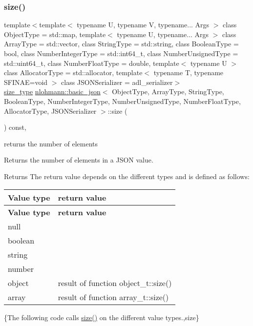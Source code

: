 \subsubsection{\texorpdfstring{size()}{size()}}
{\footnotesize\ttfamily template$<$template$<$ typename U, typename V, typename... Args $>$ class Object\+Type = std\+::map, template$<$ typename U, typename... Args $>$ class Array\+Type = std\+::vector, class String\+Type  = std\+::string, class Boolean\+Type  = bool, class Number\+Integer\+Type  = std\+::int64\+\_\+t, class Number\+Unsigned\+Type  = std\+::uint64\+\_\+t, class Number\+Float\+Type  = double, template$<$ typename U $>$ class Allocator\+Type = std\+::allocator, template$<$ typename T, typename S\+F\+I\+N\+A\+E=void $>$ class J\+S\+O\+N\+Serializer = adl\+\_\+serializer$>$ \\
\mbox{\hyperlink{classnlohmann_1_1basic__json_a39f2cd0b58106097e0e67bf185cc519b}{size\+\_\+type}} \mbox{\hyperlink{classnlohmann_1_1basic__json}{nlohmann\+::basic\+\_\+json}}$<$ Object\+Type, Array\+Type, String\+Type, Boolean\+Type, Number\+Integer\+Type, Number\+Unsigned\+Type, Number\+Float\+Type, Allocator\+Type, J\+S\+O\+N\+Serializer $>$\+::size (\begin{DoxyParamCaption}{ }\end{DoxyParamCaption}) const\hspace{0.3cm}{\ttfamily [inline]}, {\ttfamily [noexcept]}}



returns the number of elements 

Returns the number of elements in a J\+S\+ON value.

\begin{DoxyReturn}{Returns}
The return value depends on the different types and is defined as follows\+: \tabulinesep=1mm
\begin{longtabu} spread 0pt [c]{*{2}{|X[-1]}|}
\hline
\rowcolor{\tableheadbgcolor}\textbf{ Value type  }&\textbf{ return value   }\\
\endfirsthead
\hline
\endfoot
\hline
\rowcolor{\tableheadbgcolor}\textbf{ Value type  }&\textbf{ return value   }\\
\endhead
null  &{}   \\
boolean  &{}   \\
string  &{}   \\
number  &{}   \\
object  &result of function object\+\_\+t\+::size()   \\
array  &result of function array\+\_\+t\+::size()   \\
\end{longtabu}

\end{DoxyReturn}
\{The following code calls {\ttfamily \mbox{\hyperlink{classnlohmann_1_1basic__json_a25e27ad0c6d53c01871c5485e1f75b96}{size()}}} on the different value types.,size\}

